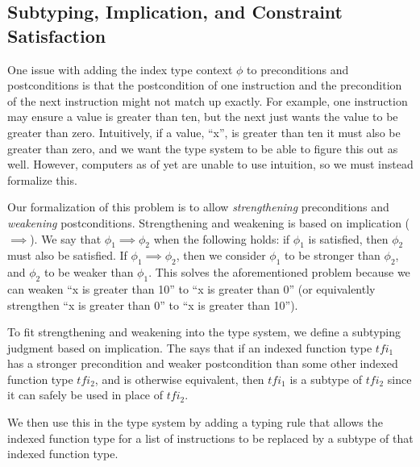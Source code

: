 \subsection{Subtyping, Implication, and Constraint Satisfaction}
\label{subsec:subtyping}
One issue with adding the index type context $\phi$ to preconditions and postconditions is that the postcondition of one instruction and the precondition of the next instruction might not match up exactly.
For example, one instruction may ensure a value is greater than ten, but the next just wants the value to be greater than zero.
Intuitively, if a value, ``x'', is greater than ten it must also be greater than zero, and we want the \name type system to be able to figure this out as well.
However, computers as of yet are unable to use intuition, so we must instead formalize this.

Our formalization of this problem is to allow \emph{strengthening} preconditions and \emph{weakening} postconditions.
Strengthening and weakening is based on implication ($\implies$).
We say that $\phi_1 \implies \phi_2$ when the following holds: if $\phi_1$ is satisfied, then $\phi_2$ must also be satisfied.
If $\phi_1 \implies \phi_2$, then we consider $\phi_1$ to be stronger than $\phi_2$, and $\phi_2$ to be weaker than $\phi_1$.
This solves the aforementioned problem because we can weaken ``x is greater than 10'' to ``x is greater than 0'' (or equivalently strengthen ``x is greater than 0'' to ``x is greater than 10'').

To fit strengthening and weakening into the type system, we define a subtyping judgment based on implication.
The  says that if an indexed function type $tfi_1$ has a stronger precondition and weaker postcondition than some other indexed function type $tfi_2$, and is otherwise equivalent, then $tfi_1$ is a subtype of $tfi_2$ since it can safely be used in place of $tfi_2$.

\begin{mathpar}
\end{mathpar}

We then use this in the \name type system by adding a typing rule that allows the indexed function type for a list of instructions to be replaced by a subtype of that indexed function type.

